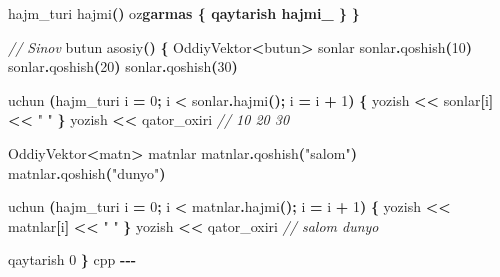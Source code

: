 \documentclass[a4paper,11pt,twoside,openright]{book}
\newenvironment{Shaded}{\begin{snugshade}}{\end{snugshade}}
\newcommand{\CharTok}[1]{\textcolor[rgb]{0.31,0.60,0.02}{#1}}
\newcommand{\CommentTok}[1]{\textcolor[rgb]{0.56,0.35,0.01}{\textit{#1}}}
\newcommand{\DecValTok}[1]{\textcolor[rgb]{0.00,0.00,0.81}{#1}}
\newcommand{\ErrorTok}[1]{\textcolor[rgb]{0.64,0.00,0.00}{\textbf{#1}}}
\newcommand{\NormalTok}[1]{#1}
\newcommand{\OperatorTok}[1]{\textcolor[rgb]{0.81,0.36,0.00}{\textbf{#1}}}
\newcommand{\StringTok}[1]{\textcolor[rgb]{0.31,0.60,0.02}{#1}}
\begin{document}
\begin{Shaded}
\begin{Highlighting}[]
\NormalTok{    hajm\_turi hajmi}\OperatorTok{()}\NormalTok{ o}\CharTok{\textquotesingle{}z}\ErrorTok{garmas \{ qaytarish hajmi\_ \}}
\OperatorTok{\}}

\CommentTok{// Sinov}
\NormalTok{butun asosiy}\OperatorTok{()} \OperatorTok{\{}
\NormalTok{    OddiyVektor}\OperatorTok{\textless{}}\NormalTok{butun}\OperatorTok{\textgreater{}}\NormalTok{ sonlar}
\NormalTok{    sonlar}\OperatorTok{.}\NormalTok{qoshish}\OperatorTok{(}\DecValTok{10}\OperatorTok{)}
\NormalTok{    sonlar}\OperatorTok{.}\NormalTok{qoshish}\OperatorTok{(}\DecValTok{20}\OperatorTok{)}
\NormalTok{    sonlar}\OperatorTok{.}\NormalTok{qoshish}\OperatorTok{(}\DecValTok{30}\OperatorTok{)}

\NormalTok{    uchun }\OperatorTok{(}\NormalTok{hajm\_turi i }\OperatorTok{=} \DecValTok{0}\OperatorTok{;}\NormalTok{ i }\OperatorTok{\textless{}}\NormalTok{ sonlar}\OperatorTok{.}\NormalTok{hajmi}\OperatorTok{();}\NormalTok{ i }\OperatorTok{=}\NormalTok{ i }\OperatorTok{+} \DecValTok{1}\OperatorTok{)} \OperatorTok{\{}
\NormalTok{        yozish }\OperatorTok{\textless{}\textless{}}\NormalTok{ sonlar}\OperatorTok{[}\NormalTok{i}\OperatorTok{]} \OperatorTok{\textless{}\textless{}} \StringTok{" "}
    \OperatorTok{\}}
\NormalTok{    yozish }\OperatorTok{\textless{}\textless{}}\NormalTok{ qator\_oxiri   }\CommentTok{// 10 20 30}

\NormalTok{    OddiyVektor}\OperatorTok{\textless{}}\NormalTok{matn}\OperatorTok{\textgreater{}}\NormalTok{ matnlar}
\NormalTok{    matnlar}\OperatorTok{.}\NormalTok{qoshish}\OperatorTok{(}\StringTok{"salom"}\OperatorTok{)}
\NormalTok{    matnlar}\OperatorTok{.}\NormalTok{qoshish}\OperatorTok{(}\StringTok{"dunyo"}\OperatorTok{)}

\NormalTok{    uchun }\OperatorTok{(}\NormalTok{hajm\_turi i }\OperatorTok{=} \DecValTok{0}\OperatorTok{;}\NormalTok{ i }\OperatorTok{\textless{}}\NormalTok{ matnlar}\OperatorTok{.}\NormalTok{hajmi}\OperatorTok{();}\NormalTok{ i }\OperatorTok{=}\NormalTok{ i }\OperatorTok{+} \DecValTok{1}\OperatorTok{)} \OperatorTok{\{}
\NormalTok{        yozish }\OperatorTok{\textless{}\textless{}}\NormalTok{ matnlar}\OperatorTok{[}\NormalTok{i}\OperatorTok{]} \OperatorTok{\textless{}\textless{}} \StringTok{" "}
    \OperatorTok{\}}
\NormalTok{    yozish }\OperatorTok{\textless{}\textless{}}\NormalTok{ qator\_oxiri   }\CommentTok{// salom dunyo}

\NormalTok{    qaytarish }\DecValTok{0}
\OperatorTok{\}}
\ErrorTok{\textasciigrave{}\textasciigrave{}\textasciigrave{}}\NormalTok{cpp}
\OperatorTok{{-}{-}{-}}


\end{Highlighting}
\end{Shaded}
\end{document}

